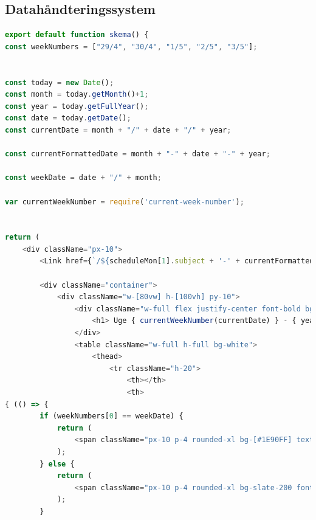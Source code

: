 \documentclass[12pt, a4paper]{article}
\begin{document}
\begin{appendices}
        \section{Datahåndteringssystem \label{appendix:datahåndteringssystem}} \newpage
        \renewcommand*{\thepage}{F\arabic{page}}
        \begin{lstlisting}[language=Javascript]
export default function skema() {
const weekNumbers = ["29/4", "30/4", "1/5", "2/5", "3/5"];


const today = new Date();
const month = today.getMonth()+1;
const year = today.getFullYear();
const date = today.getDate();
const currentDate = month + "/" + date + "/" + year;

const currentFormattedDate = month + "-" + date + "-" + year; 

const weekDate = date + "/" + month;

var currentWeekNumber = require('current-week-number');


return (
    <div className="px-10">
        <Link href={`/${scheduleMon[1].subject + '-' + currentFormattedDate}`}></Link>
        
        <div className="container">
            <div className="w-[80vw] h-[100vh] py-10">
                <div className="w-full flex justify-center font-bold bg-white py-2">
                    <h1> Uge { currentWeekNumber(currentDate) } - { year }</h1>
                </div>
                <table className="w-full h-full bg-white">
                    <thead>
                        <tr className="h-20">
                            <th></th>
                            <th> 
{ (() => {
        if (weekNumbers[0] == weekDate) {
            return (
                <span className="px-10 p-4 rounded-xl bg-[#1E90FF] text-white font-normal">Mandag <strong>{ weekNumbers[0] }</strong></span> 
            );
        } else {
            return (
                <span className="px-10 p-4 rounded-xl bg-slate-200 font-normal">Mandag <strong>{ weekNumbers[0] }</strong></span>
            );
        }


\end{lstlisting}
\end{appendices}
\end{document}
